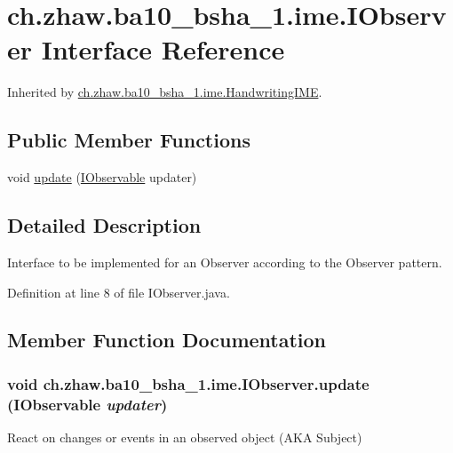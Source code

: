 \hypertarget{interfacech_1_1zhaw_1_1ba10__bsha__1_1_1ime_1_1IObserver}{
\section{ch.zhaw.ba10\_\-bsha\_\-1.ime.IObserver Interface Reference}
\label{interfacech_1_1zhaw_1_1ba10__bsha__1_1_1ime_1_1IObserver}
}


Inherited by \hyperlink{classch_1_1zhaw_1_1ba10__bsha__1_1_1ime_1_1HandwritingIME}{ch.zhaw.ba10\_\-bsha\_\-1.ime.HandwritingIME}.\subsection*{Public Member Functions}
\begin{DoxyCompactItemize}
\item 
void \hyperlink{interfacech_1_1zhaw_1_1ba10__bsha__1_1_1ime_1_1IObserver_a9bd8c4a6a6aaaf70d771c8f4b08a748d}{update} (\hyperlink{interfacech_1_1zhaw_1_1ba10__bsha__1_1_1ime_1_1IObservable}{IObservable} updater)
\end{DoxyCompactItemize}


\subsection{Detailed Description}
Interface to be implemented for an Observer according to the Observer pattern. 

Definition at line 8 of file IObserver.java.

\subsection{Member Function Documentation}
\hypertarget{interfacech_1_1zhaw_1_1ba10__bsha__1_1_1ime_1_1IObserver_a9bd8c4a6a6aaaf70d771c8f4b08a748d}{
\subsubsection[{update}]{\setlength{\rightskip}{0pt plus 5cm}void ch.zhaw.ba10\_\-bsha\_\-1.ime.IObserver.update ({\bf IObservable} {\em updater})}}
\label{interfacech_1_1zhaw_1_1ba10__bsha__1_1_1ime_1_1IObserver_a9bd8c4a6a6aaaf70d771c8f4b08a748d}
React on changes or events in an observed object (AKA Subject)


